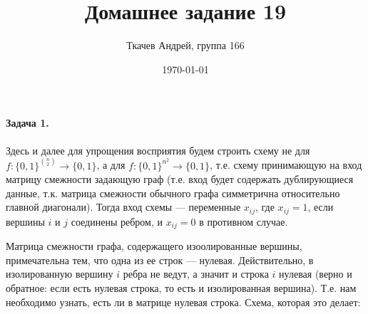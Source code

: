 \documentclass{article}
\title{Домашнее задание 19}
\author{Ткачев Андрей, группа 166}
\date{\today}
\begin{document}
    \maketitle
    \paragraph{Задача 1.}
    Здесь и далее для упрощения восприятия будем строить схему не для $f:\{0, 1\}^{{n \choose 2}} \rightarrow \{0, 1\}$, а для $f:\{0, 1\}^{n^2} \rightarrow \{0, 1\}$, т.е. схему принимающую на вход матрицу смежности задающую граф (т.е. вход будет содержать дублирующиеся данные, т.к. матрица смежности обычного графа симметрична относительно главной диагонали). Тогда вход схемы --- переменные $x_{ij}$, где $x_{ij} = 1$, если вершины $i$ и $j$ соединены ребром, и $x_{ij} = 0$ в противном случае.

    Матрица смежности графа, содержащего изоолированные вершины, примечательна тем, что одна из ее строк --- нулевая. Действительно, в изолированную вершину $i$ ребра не ведут, а значит и строка $i$ нулевая (верно и обратное: если есть нулевая строка, то есть и изолированная вершина). Т.е. нам необходимо узнать, есть ли в матрице нулевая строка. Схема, которая это делает:
\end{document}
